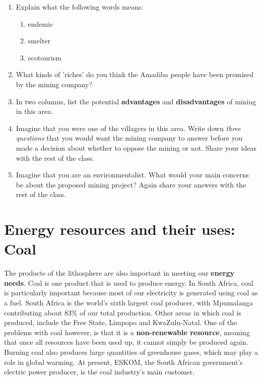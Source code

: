{\begin{enumerate}
\item{Explain what the following words means:}
\begin{enumerate}
\item{endemic}
\item{smelter}
\item{ecotourism}
\end{enumerate}
\item{What kinds of 'riches' do you think the Amadiba people have been promised by the mining company?}
\item{In two columns, list the potential \textbf{advantages} and \textbf{disadvantages} of mining in this area.}
\item{Imagine that you were one of the villagers in this area. Write down \textit{three questions} that you would want the mining company to answer before you made a decision about whether to oppose the mining or not. Share your ideas with the rest of the class.}
\item{Imagine that you are an environmentalist. What would your main concerns be about the proposed mining project? Again share your answers with the rest of the class.}
\end{enumerate}

}







\section{Energy resources and their uses: Coal}
\label{sec:mining:energy}

The products of the lithosphere are also important in meeting our \textbf{energy needs}. Coal is one product that is used to produce energy. In South Africa, coal is particularly important because most of our electricity is generated using coal as a fuel.  South Africa is the world's sixth largest coal producer, with Mpumalanga contributing about 83\% of our total production. Other areas in which coal is produced, include the Free State, Limpopo and KwaZulu-Natal. One of the problems with coal however, is that it is a \textbf{non-renewable resource}, meaning that once all resources have been used up, it cannot simply be produced again. Burning coal also produces large quantities of greenhouse gases, which may play a role in global warming. At present, ESKOM, the South African government's electric power producer, is the coal industry's main customer.\\


